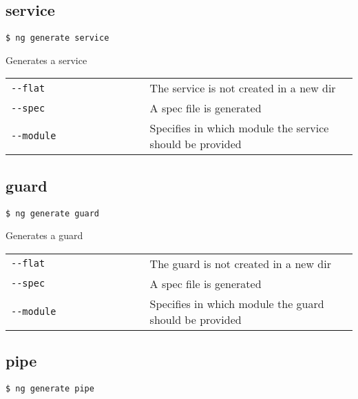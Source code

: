 \documentclass[8pt]{extarticle} %
\begin{document}
\begin{multicols*}{3}
  \subsection*{service}

    \vspace{1ex}
    {\tt \$ ng generate service  \itt{[options...]}}
    \vspace{0.6ex}

    {\small Generates a service}
    \vspace{0.6ex}

    \begin{tabular}{L{0.40\linewidth} L{0.60\linewidth}}
      \tt -{}-flat & \small The service is not created in a new dir \\
      \tt -{}-spec & \small A spec file is generated \\
      \tt -{}-module  & \small Specifies in which module the service should be provided \\
    \end{tabular}

    \vfill

  \subsection*{guard}

    \vspace{1ex}
    {\tt \$ ng generate guard  \itt{[options...]}}
    \vspace{0.6ex}

    {\small Generates a guard}
    \vspace{0.6ex}

    \begin{tabular}{L{0.40\linewidth} L{0.60\linewidth}}
      \tt -{}-flat & \small The guard is not created in a new dir \\
      \tt -{}-spec & \small A spec file is generated \\
      \tt -{}-module  & \small Specifies in which module the guard should be provided \\
    \end{tabular}

  \subsection*{pipe}

    \vspace{1ex}
    {\tt \$ ng generate pipe  \itt{[options...]}}
    \vspace{0.6ex}


\end{multicols*}
\end{document}
